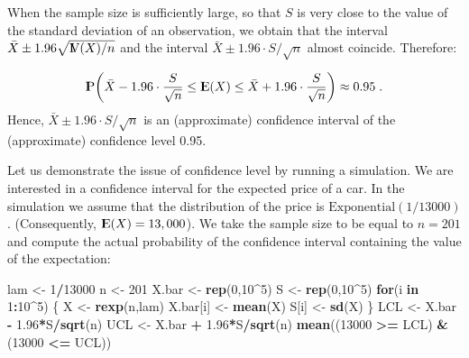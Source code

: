 \documentclass[]{krantz}
\makeatletter
\newenvironment{Shaded}{\begin{snugshade}}{\end{snugshade}}
\newcommand{\KeywordTok}[1]{\textcolor[rgb]{0.13,0.29,0.53}{\textbf{#1}}}
\newcommand{\DecValTok}[1]{\textcolor[rgb]{0.00,0.00,0.81}{#1}}
\newcommand{\FloatTok}[1]{\textcolor[rgb]{0.00,0.00,0.81}{#1}}
\newcommand{\StringTok}[1]{\textcolor[rgb]{0.31,0.60,0.02}{#1}}
\newcommand{\ControlFlowTok}[1]{\textcolor[rgb]{0.13,0.29,0.53}{\textbf{#1}}}
\newcommand{\OperatorTok}[1]{\textcolor[rgb]{0.81,0.36,0.00}{\textbf{#1}}}
\newcommand{\NormalTok}[1]{#1}
\newcommand{\Expec}{{\rm I\kern-.3em E}}
\newcommand{\Prob}{{\rm I\kern-.3em P}}
\newcommand{\Var}{{\rm I\kern-.3em V}}
\newenvironment{kframe}{%
\medskip{}
\setlength{\fboxsep}{.8em}
 \def\at@end@of@kframe{}%
 \ifinner\ifhmode%
  \def\at@end@of@kframe{\end{minipage}}%
  \begin{minipage}{\columnwidth}%
 \fi\fi%
 \def\FrameCommand##1{\hskip\@totalleftmargin \hskip-\fboxsep
 \colorbox{shadecolor}{##1}\hskip-\fboxsep
     \hskip-\linewidth \hskip-\@totalleftmargin \hskip\columnwidth}%
 \MakeFramed {\advance\hsize-\width
   \@totalleftmargin\z@ \linewidth\hsize
   \@setminipage}}%
 {\par\unskip\endMakeFramed%
 \at@end@of@kframe}
\renewenvironment{Shaded}{\begin{kframe}}{\end{kframe}}
\theoremstyle{definition}
\theoremstyle{definition}
\theoremstyle{definition}
\theoremstyle{remark}
\makeatother
\begin{document}
When the sample size is sufficiently large, so that \(S\) is very close
to the value of the standard deviation of an observation, we obtain that
the interval \(\bar X \pm 1.96 \sqrt{\Var(X)/n}\) and the interval
\(\bar X \pm 1.96 \cdot S/\sqrt{n}\) almost coincide. Therefore:

\[\Prob \bigg( \bar X -1.96 \cdot \frac{S}{\sqrt{n}} \leq  \Expec(X) \leq \bar X + 1.96 \cdot \frac{S}{\sqrt{n}}\bigg) \approx 0.95\;.\]
Hence, \(\bar X \pm 1.96 \cdot S/\sqrt{n}\) is an (approximate)
confidence interval of the (approximate) confidence level 0.95.

Let us demonstrate the issue of confidence level by running a
simulation. We are interested in a confidence interval for the expected
price of a car. In the simulation we assume that the distribution of the
price is \(\mathrm{Exponential}(1/13000)\). (Consequently,
\(\Expec(X) = 13,000\)). We take the sample size to be equal to
\(n=201\) and compute the actual probability of the confidence interval
containing the value of the expectation:

\begin{Shaded}
\begin{Highlighting}[]
\NormalTok{lam <-}\StringTok{ }\DecValTok{1}\OperatorTok{/}\DecValTok{13000}
\NormalTok{n <-}\StringTok{ }\DecValTok{201}
\NormalTok{X.bar <-}\StringTok{ }\KeywordTok{rep}\NormalTok{(}\DecValTok{0}\NormalTok{,}\DecValTok{10}\OperatorTok{^}\DecValTok{5}\NormalTok{)}
\NormalTok{S <-}\StringTok{ }\KeywordTok{rep}\NormalTok{(}\DecValTok{0}\NormalTok{,}\DecValTok{10}\OperatorTok{^}\DecValTok{5}\NormalTok{)}
\ControlFlowTok{for}\NormalTok{(i }\ControlFlowTok{in} \DecValTok{1}\OperatorTok{:}\DecValTok{10}\OperatorTok{^}\DecValTok{5}\NormalTok{) \{}
\NormalTok{  X <-}\StringTok{ }\KeywordTok{rexp}\NormalTok{(n,lam)}
\NormalTok{  X.bar[i] <-}\StringTok{ }\KeywordTok{mean}\NormalTok{(X)}
\NormalTok{  S[i] <-}\StringTok{ }\KeywordTok{sd}\NormalTok{(X)}
\NormalTok{\}}
\NormalTok{LCL <-}\StringTok{ }\NormalTok{X.bar }\OperatorTok{-}\StringTok{ }\FloatTok{1.96}\OperatorTok{*}\NormalTok{S}\OperatorTok{/}\KeywordTok{sqrt}\NormalTok{(n)}
\NormalTok{UCL <-}\StringTok{ }\NormalTok{X.bar }\OperatorTok{+}\StringTok{ }\FloatTok{1.96}\OperatorTok{*}\NormalTok{S}\OperatorTok{/}\KeywordTok{sqrt}\NormalTok{(n)}
\KeywordTok{mean}\NormalTok{((}\DecValTok{13000} \OperatorTok{>=}\StringTok{ }\NormalTok{LCL) }\OperatorTok{&}\StringTok{ }\NormalTok{(}\DecValTok{13000} \OperatorTok{<=}\StringTok{ }\NormalTok{UCL))}
\end{Highlighting}
\end{Shaded}
\end{document}
